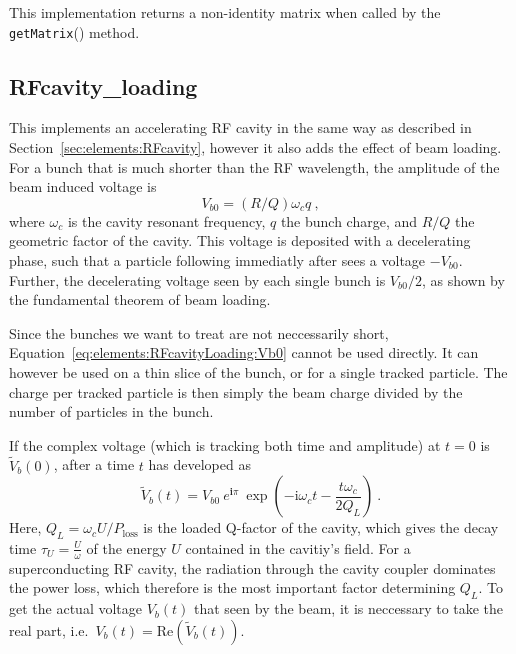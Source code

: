 \documentclass[a4paper]{report}
\begin{document}
This implementation returns a non-identity matrix when called by the \texttt{get\-Matrix}() method.


\subsection{RFcavity\_loading}

This implements an accelerating RF cavity in the same way as described in Section~\ref{sec:elements:RFcavity}, however it also adds the effect of beam loading.
For a bunch that is much shorter than the RF wavelength, the amplitude of the beam induced voltage is 
\begin{equation}
  V_{b0} = (R/Q) \omega_c q~,
  \label{eq:elements:RFcavityLoading:Vb0}
\end{equation}
where $\omega_c$ is the cavity resonant frequency, $q$ the bunch charge, and $R/Q$ the geometric factor of the cavity.
This voltage is deposited with a decelerating phase, such that a particle following immediatly after sees a voltage $-V_{b0}$.
Further, the decelerating voltage seen by each single bunch is $V_{b0}/2$, as shown by the fundamental theorem of beam loading.

Since the bunches we want to treat are not neccessarily short, Equation~\eqref{eq:elements:RFcavityLoading:Vb0} cannot be used directly.
It can however be used on a thin slice of the bunch, or for a single tracked particle.
The charge per tracked particle is then simply the beam charge divided by the number of particles in the bunch.

If the complex voltage (which is tracking both time and amplitude) at $t=0$ is $\tilde V_b(0)$, after a time $t$ has developed as
\begin{equation}
  \tilde V_b(t) =  V_{b0} ~ e^{\mathbf{i}\pi} ~ \exp\left(-\mathrm{i}\omega_ct - \frac{t \omega_c}{2Q_L} \right)~.
  \label{eq:elements:RFcavityLoading:VbProp}
\end{equation}
Here, $Q_L = \omega_c U / P_\mathrm{loss}$ is the loaded Q-factor of the cavity, which gives the decay time $\tau_U = \frac{U}{\omega}$ of the energy $U$ contained in the cavitiy's field.
For a superconducting RF cavity, the radiation through the cavity coupler dominates the power loss, which therefore is the most important factor determining $Q_L$.
To get the actual voltage $V_b(t)$ that seen by the beam, it is neccessary to take the real part, i.e.\ $V_b(t) = \mathrm{Re}\left(\tilde V_b(t) \right)$.
\end{document}
